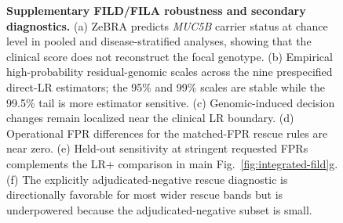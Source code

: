 {\begin{figure}[!p]
{%
}
\caption{\textbf{Supplementary FILD/FILA robustness and secondary diagnostics.}
(a) ZeBRA predicts \textit{MUC5B} carrier status at chance level in pooled and disease-stratified analyses, showing that the clinical score does not reconstruct the focal genotype. (b) Empirical high-probability residual-genomic scales across the nine prespecified direct-LR estimators; the 95\% and 99\% scales are stable while the 99.5\% tail is more estimator sensitive. (c) Genomic-induced decision changes remain localized near the clinical LR boundary. (d) Operational FPR differences for the matched-FPR rescue rules are near zero. (e) Held-out sensitivity at stringent requested FPRs complements the LR$+$ comparison in main Fig.~\ref{fig:integrated-fild}g. (f) The explicitly adjudicated-negative rescue diagnostic is directionally favorable for most wider rescue bands but is underpowered because the adjudicated-negative subset is small.}
\label{fig:supp-integrated}
\end{figure}%
}
